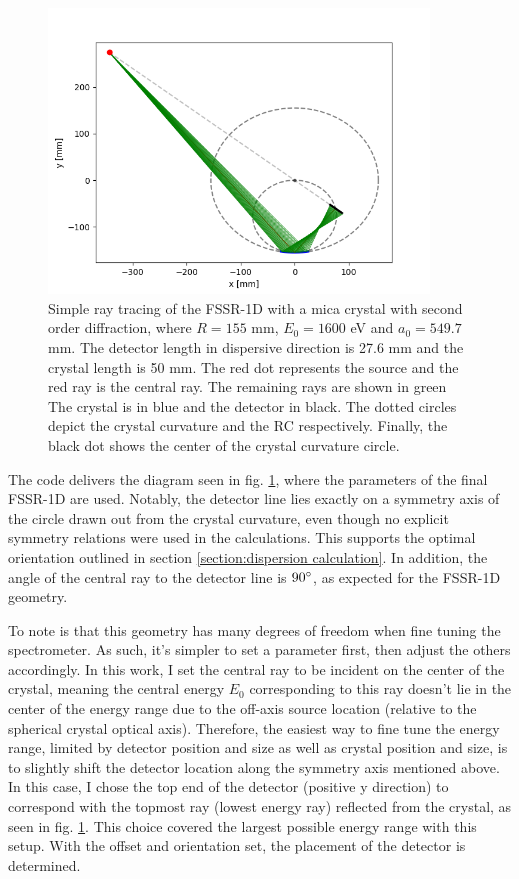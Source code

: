 \begin{figure}[H]
	\centering
	\includegraphics[width=0.9\textwidth]{Diagrams/FSSRsimpleRayTracing.png}
	\caption{Simple ray tracing of the FSSR-1D with 
	a mica 
	crystal with second order diffraction, where $R = 
	155$ 
	\unit{mm}, $E_0 = 1600$ \unit{eV} and $a_0 = 
	549.7$ 
	\unit{mm}. The detector 
	length in dispersive direction is 27.6 \unit{mm} and the 
	crystal length is 
	50 \unit{mm}. The red dot represents the source 
	and the red ray is the central ray. The remaining rays are 
	shown in green 
	The crystal is in blue and the detector in black. The dotted 
	circles depict 
	the crystal curvature and the RC respectively. Finally, the 
	black dot shows 
	the center of the crystal curvature circle.}
	\label{FSSRSimpleRayTracing}
\end{figure}

The code delivers the diagram seen in fig. 
\ref{FSSRSimpleRayTracing}, where 
the parameters of the final FSSR-1D are used. 
Notably, the 
detector line 
lies exactly on a symmetry axis of the circle drawn out from the 
crystal 
curvature, even though no explicit symmetry relations were used 
in the 
calculations. This supports the optimal orientation outlined in 
section \ref{section:dispersion calculation}. In 
addition, the angle of the central ray to the detector line is 
$90\degree$, as   
expected for the FSSR-1D geometry.

To note is that this geometry has many degrees of freedom when fine tuning the 
spectrometer. As such, it's simpler to set a parameter first, then adjust the 
others accordingly. In this work, I set the central ray to be incident on the 
center of the crystal, meaning the central energy $E_0$ corresponding to this 
ray doesn't lie in the center of the energy range due to the off-axis source 
location (relative to the spherical crystal optical axis). Therefore, the 
easiest way to fine tune the energy range, limited by detector position and 
size as well as crystal position and size, is to slightly shift the detector 
location along the symmetry axis mentioned above. In this case, I chose the top 
end of the detector (positive y direction) to correspond with the topmost ray 
(lowest energy ray) reflected from the crystal, as seen in fig. 
\ref{FSSRSimpleRayTracing}. This choice covered the largest 
possible energy range with this setup. With the offset and 
orientation set, the placement of the detector is determined. 

